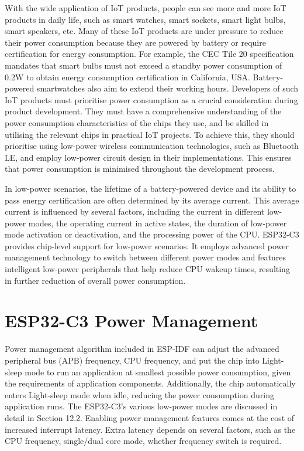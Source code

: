\documentclass[a4paper,12pt,openany]{book}
\begin{document}
\vspace{36pt}
With the wide application of IoT products, people can see more and more IoT products in daily life, such as smart watches, smart sockets, smart light bulbs, smart speakers, etc. Many of these IoT products are under pressure to reduce their power consumption because they are powered by battery or require certification for energy consumption. For example, the CEC Tile 20 specification mandates that smart bulbs must not exceed a standby power consumption of 0.2W to obtain energy consumption certification in California, USA. Battery-powered smartwatches also aim to extend their working hours. Developers of such IoT products must prioritise power consumption as a crucial consideration during product development. They must have a comprehensive understanding of the power consumption characteristics of the chips they use, and be skilled in utilising the relevant chips in practical IoT projects. To achieve this, they should prioritise using low-power wireless communication technologies, such as Bluetooth LE, and employ low-power circuit design in their implementations. This ensures that power consumption is minimised throughout the development process.

In low-power scenarios, the lifetime of a battery-powered device and its ability to pass energy certification are often determined by its average current. This average current is influenced by several factors, including the current in different low-power modes, the operating current in active states, the duration of low-power mode activation or deactivation, and the processing power of the CPU. ESP32-C3 provides chip-level support for low-power scenarios. It employs advanced power management technology to switch between different power modes and features intelligent low-power peripherals that help reduce CPU wakeup times, resulting in further reduction of overall power consumption.

\section{ESP32-C3 Power Management}
Power management algorithm included in ESP-IDF can adjust the advanced peripheral bus (APB) frequency, CPU frequency, and put the chip into Light-sleep mode to run an application at smallest possible power consumption, given the requirements of application components. Additionally, the chip automatically enters Light-sleep mode when idle, reducing the power consumption during application runs. The ESP32-C3's various low-power modes are discussed in detail in Section 12.2. Enabling power management features comes at the cost of increased interrupt latency. Extra latency depends on several factors, such as the CPU frequency, single/dual core mode, whether frequency switch is required.
\end{document}
